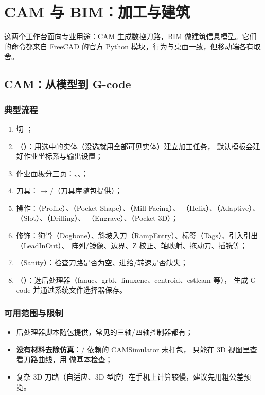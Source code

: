 \chapter{CAM 与 BIM：加工与建筑}

这两个工作台面向专业用途：CAM 生成数控刀路，BIM 做建筑信息模型。它们的命令都来自 FreeCAD 的官方
Python 模块，行为与桌面一致，但移动端各有取舍。

\section{CAM：从模型到 G-code}

\subsection{典型流程}

\begin{enumerate}
  \item 切 ；
  \item {}（）：用选中的实体（没选就用全部可见实体）建立加工任务，
        默认模板会建好作业坐标系与输出设置；
  \item 作业面板分三页：、、；
  \item 刀具： → /（刀具库随包提供）；
  \item 操作：（Profile）、（Pocket Shape）、（Mill Facing）、
        （Helix）、（Adaptive）、（Slot）、（Drilling）、
        （Engrave）、（Pocket 3D）；
  \item 修饰：狗骨（Dogbone）、斜坡入刀（RampEntry）、标签（Tags）、引入引出（LeadInOut）、
        阵列/镜像、边界、Z 校正、轴映射、拖动刀、插铣等；
  \item {}（Sanity）：检查刀路是否为空、进给/转速是否缺失；
  \item {}（）：选后处理器（fanuc、grbl、linuxcnc、centroid、estlcam 等），
        生成 G-code 并通过系统文件选择器保存。
\end{enumerate}

\subsection{可用范围与限制}

\begin{itemize}
  \item 后处理器脚本随包提供，常见的三轴/四轴控制器都有；
  \item \textbf{没有材料去除仿真}：/ 依赖的 CAMSimulator 未打包，
        只能在 3D 视图里查看刀路曲线，用  做基本检查；
  \item 复杂 3D 刀路（自适应、3D 型腔）在手机上计算较慢，建议先用粗公差预览。
\end{itemize}

